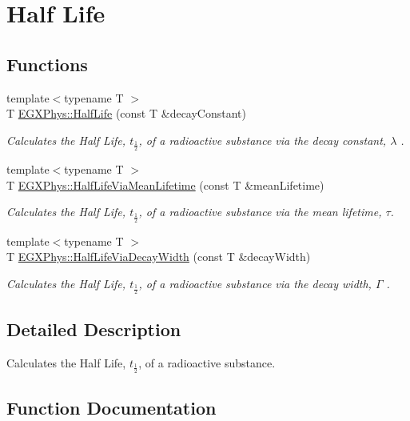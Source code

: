 \hypertarget{group___half_life}{}\section{Half Life}
\label{group___half_life}
\subsection*{Functions}
\begin{DoxyCompactItemize}
\item 
{\footnotesize template$<$typename T $>$ }\\T \hyperlink{group___half_life_ga21d268f154fb91c1c556bbfa7fe83ac1}{E\+G\+X\+Phys\+::\+Half\+Life} (const T \&decay\+Constant)
\begin{DoxyCompactList}\small\item\em Calculates the Half Life, $t_{\frac{1}{2}}$, of a radioactive substance via the decay constant, $\lambda$ . \end{DoxyCompactList}\item 
{\footnotesize template$<$typename T $>$ }\\T \hyperlink{group___half_life_gacddef16b62e98b214ec8dd8af7da7dce}{E\+G\+X\+Phys\+::\+Half\+Life\+Via\+Mean\+Lifetime} (const T \&mean\+Lifetime)
\begin{DoxyCompactList}\small\item\em Calculates the Half Life, $t_{\frac{1}{2}}$, of a radioactive substance via the mean lifetime, $\tau$. \end{DoxyCompactList}\item 
{\footnotesize template$<$typename T $>$ }\\T \hyperlink{group___half_life_gaba3fda944d1a68ee1016a1f2f5809359}{E\+G\+X\+Phys\+::\+Half\+Life\+Via\+Decay\+Width} (const T \&decay\+Width)
\begin{DoxyCompactList}\small\item\em Calculates the Half Life, $t_{\frac{1}{2}}$, of a radioactive substance via the decay width, $\Gamma$ . \end{DoxyCompactList}\end{DoxyCompactItemize}


\subsection{Detailed Description}
Calculates the Half Life, $t_{\frac{1}{2}}$, of a radioactive substance. 

\subsection{Function Documentation}
\mbox{\label{group___half_life_ga21d268f154fb91c1c556bbfa7fe83ac1}} 
